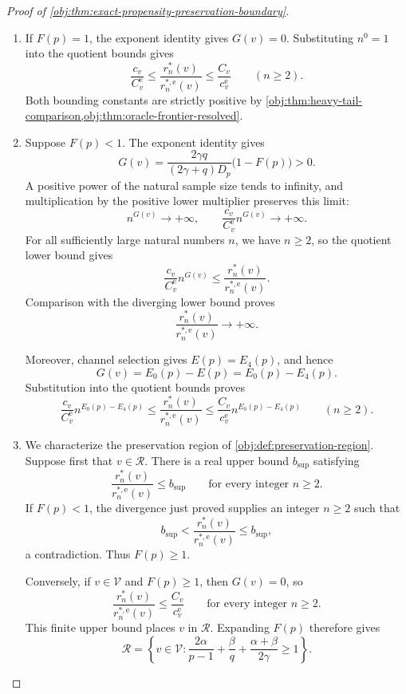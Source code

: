 \documentclass[11pt]{article}
\begin{document}
\begin{proof}[Proof of \cref{obj:thm:exact-propensity-preservation-boundary}]
\begin{enumerate}
\item If \(F(p)=1\), the exponent identity gives \(G(v)=0\). Substituting \(n^0=1\) into the quotient bounds gives
\[
\frac{c_v}{C^{\mathrm e}_v}
\le
\frac{r_n^*(v)}{r_n^{*,\mathrm e}(v)}
\le
\frac{C_v}{c^{\mathrm e}_v}
\qquad(n\ge2).
\]
Both bounding constants are strictly positive by \cref{obj:thm:heavy-tail-comparison,obj:thm:oracle-frontier-resolved}.

\item Suppose \(F(p)<1\). The exponent identity gives
\[
G(v)=
\frac{2\gamma q}{(2\gamma+q)D_p}\bigl(1-F(p)\bigr)>0.
\]
A positive power of the natural sample size tends to infinity, and multiplication by the positive lower multiplier preserves this limit:
\[
n^{G(v)}\longrightarrow+\infty,
\qquad
\frac{c_v}{C^{\mathrm e}_v}n^{G(v)}
\longrightarrow+\infty.
\]
For all sufficiently large natural numbers \(n\), we have \(n\ge2\), so the quotient lower bound gives
\[
\frac{c_v}{C^{\mathrm e}_v}n^{G(v)}
\le
\frac{r_n^*(v)}{r_n^{*,\mathrm e}(v)}.
\]
Comparison with the diverging lower bound proves
\[
\frac{r_n^*(v)}{r_n^{*,\mathrm e}(v)}
\longrightarrow+\infty.
\]

Moreover, channel selection gives \(E(p)=E_4(p)\), and hence
\[
G(v)=E_0(p)-E(p)=E_0(p)-E_4(p).
\]
Substitution into the quotient bounds proves
\[
\frac{c_v}{C^{\mathrm e}_v}n^{E_0(p)-E_4(p)}
\le
\frac{r_n^*(v)}{r_n^{*,\mathrm e}(v)}
\le
\frac{C_v}{c^{\mathrm e}_v}n^{E_0(p)-E_4(p)}
\qquad(n\ge2).
\]

\item We characterize the preservation region of
\cref{obj:def:preservation-region}. Suppose first that \(v\in\mathcal R\).
There is a real upper bound \(b_{\mathrm{sup}}\) satisfying
\[
\frac{r_n^*(v)}{r_n^{*,\mathrm e}(v)}
\le b_{\mathrm{sup}}
\qquad\text{for every integer }n\ge2.
\]
If \(F(p)<1\), the divergence just proved supplies an integer \(n\ge2\) such that
\[
b_{\mathrm{sup}}
<
\frac{r_n^*(v)}{r_n^{*,\mathrm e}(v)}
\le b_{\mathrm{sup}},
\]
a contradiction. Thus \(F(p)\ge1\).

Conversely, if \(v\in\mathcal V\) and \(F(p)\ge1\), then \(G(v)=0\), so
\[
\frac{r_n^*(v)}{r_n^{*,\mathrm e}(v)}
\le\frac{C_v}{c^{\mathrm e}_v}
\qquad\text{for every integer }n\ge2.
\]
This finite upper bound places \(v\) in \(\mathcal R\). Expanding \(F(p)\) therefore gives
\[
\mathcal R
=
\left\{v\in\mathcal V:
\frac{2\alpha}{p-1}
+\frac{\beta}{q}
+\frac{\alpha+\beta}{2\gamma}\ge1
\right\}.
\]


\end{enumerate}
\end{proof}
\end{document}
